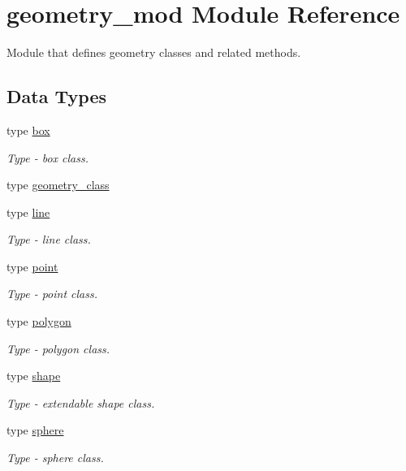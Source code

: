 \hypertarget{namespacegeometry__mod}{}\section{geometry\+\_\+mod Module Reference}
\label{namespacegeometry__mod}


Module that defines geometry classes and related methods.  


\subsection*{Data Types}
\begin{DoxyCompactItemize}
\item 
type \mbox{\hyperlink{structgeometry__mod_1_1box}{box}}
\begin{DoxyCompactList}\small\item\em Type -\/ box class. \end{DoxyCompactList}\item 
type \mbox{\hyperlink{structgeometry__mod_1_1geometry__class}{geometry\+\_\+class}}
\item 
type \mbox{\hyperlink{structgeometry__mod_1_1line}{line}}
\begin{DoxyCompactList}\small\item\em Type -\/ line class. \end{DoxyCompactList}\item 
type \mbox{\hyperlink{structgeometry__mod_1_1point}{point}}
\begin{DoxyCompactList}\small\item\em Type -\/ point class. \end{DoxyCompactList}\item 
type \mbox{\hyperlink{structgeometry__mod_1_1polygon}{polygon}}
\begin{DoxyCompactList}\small\item\em Type -\/ polygon class. \end{DoxyCompactList}\item 
type \mbox{\hyperlink{structgeometry__mod_1_1shape}{shape}}
\begin{DoxyCompactList}\small\item\em Type -\/ extendable shape class. \end{DoxyCompactList}\item 
type \mbox{\hyperlink{structgeometry__mod_1_1sphere}{sphere}}
\begin{DoxyCompactList}\small\item\em Type -\/ sphere class. \end{DoxyCompactList}\end{DoxyCompactItemize}
